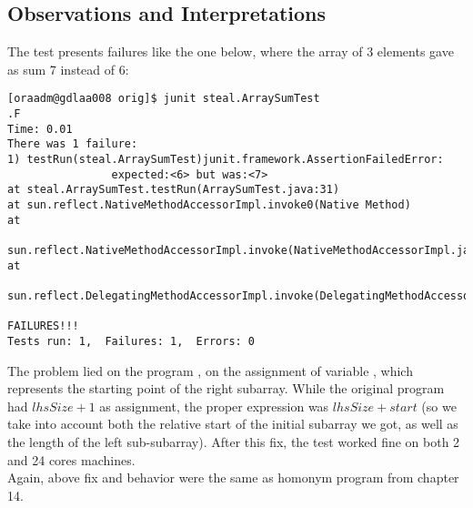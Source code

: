 \subsection{Observations and Interpretations}
The test presents failures like the one below, where the array of 3
elements gave as sum 7 instead of 6: \\

\begin{verbatim}
[oraadm@gdlaa008 orig]$ junit steal.ArraySumTest
.F
Time: 0.01
There was 1 failure:
1) testRun(steal.ArraySumTest)junit.framework.AssertionFailedError:
                expected:<6> but was:<7>
at steal.ArraySumTest.testRun(ArraySumTest.java:31)
at sun.reflect.NativeMethodAccessorImpl.invoke0(Native Method)
at
                
sun.reflect.NativeMethodAccessorImpl.invoke(NativeMethodAccessorImpl.java:57)
at
                
sun.reflect.DelegatingMethodAccessorImpl.invoke(DelegatingMethodAccessorImpl.java:43)

FAILURES!!!
Tests run: 1,  Failures: 1,  Errors: 0
\end{verbatim}
\hfill

The problem lied on the program , on the assignment
of variable , which represents the starting point of the
right subarray. While the original program had $lhsSize + 1$
as assignment, the proper expression was $lhsSize + start$ (so we take
into account both the relative start of the initial subarray we got,
as well as the length of the left sub-subarray). After this fix, the test
worked fine on both 2 and 24 cores machines. \\

Again, above fix and behavior were the same as homonym program from    
chapter 14. 

